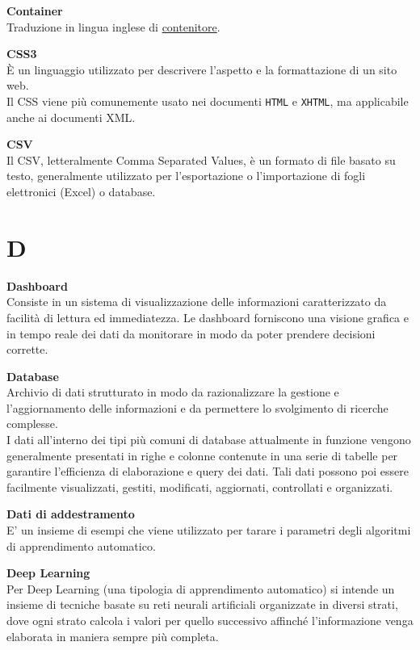 \documentclass[a4paper, oneside, openany, dvipsnames, table, 12pt]{article}
\begin{document}
\textbf{Container} \\
Traduzione in lingua inglese di \hyperref[par:container]{contenitore\glo}.

\label{par:css3}
\textbf{CSS3} \\
È un linguaggio utilizzato per descrivere l’aspetto e la formattazione di un sito web. \\
Il CSS viene più comunemente usato nei documenti \texttt{HTML} e \texttt{XHTML}, ma applicabile anche ai documenti XML. 

\textbf{CSV} \\
Il CSV, letteralmente Comma Separated Values, è un formato di file basato su testo, generalmente utilizzato per l'esportazione o l'importazione di fogli elettronici (Excel) o database.

\newpage
\section{D}
\label{par:db}
\textbf{Dashboard} \\
Consiste in un sistema di visualizzazione delle informazioni caratterizzato da facilità di lettura ed immediatezza. Le dashboard forniscono una visione grafica e in tempo reale dei dati da monitorare in modo da poter prendere decisioni corrette.

\textbf{Database} \\
Archivio di dati strutturato in modo da razionalizzare la gestione e l'aggiornamento delle informazioni e da permettere lo svolgimento di ricerche complesse. \\
I dati all'interno dei tipi più comuni di database attualmente in funzione vengono generalmente presentati in righe e colonne contenute in una serie di tabelle per garantire l'efficienza di elaborazione e query dei dati. Tali dati possono poi essere facilmente visualizzati, gestiti, modificati, aggiornati, controllati e organizzati.

\textbf{Dati di addestramento} \\
E’ un insieme di esempi che viene utilizzato per tarare i parametri degli algoritmi di apprendimento automatico.


\textbf{Deep Learning} \\
Per Deep Learning (una tipologia di apprendimento automatico) si intende un insieme di tecniche basate su reti neurali artificiali organizzate in diversi strati, dove ogni strato calcola i valori per quello successivo affinché l'informazione venga elaborata in maniera sempre più completa.
\end{document}
